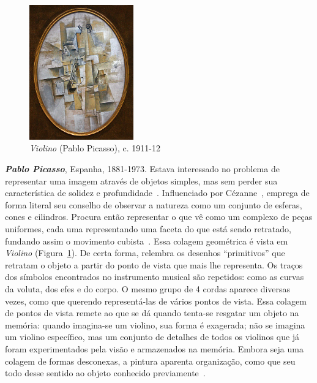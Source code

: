 \begin{figure}
  \begin{center}
    \includegraphics[width=0.4\textwidth]{figs/picasso_violino.png}
  \end{center}
  \caption{\emph{Violino} (Pablo Picasso), c. 1911-12}
  \label{fig:picasso:violino}
\end{figure}

\textbf{\emph{Pablo Picasso}}, Espanha, 1881-1973. Estava interessado
no problema de representar uma imagem através de objetos simples, mas
sem perder sua característica de solidez e
profundidade~\cite{daix,gombrich}. Influenciado por
Cézanne~\cite{rishel}, emprega de forma literal seu conselho de
observar a natureza como um conjunto de esferas, cones e
cilindros. Procura então representar o que vê como um complexo de
peças uniformes, cada uma representando uma faceta do que está sendo
retratado, fundando assim o movimento cubista~\cite{barr,golding}.
Essa colagem geométrica é vista em \emph{Violino}
(Figura~\ref{fig:picasso:violino}). De certa forma, relembra os
desenhos ``primitivos'' que retratam o objeto a partir do ponto de
vista que mais lhe representa. Os traços dos símbolos encontrados no
instrumento musical são repetidos: como as curvas da voluta, dos efes
e do corpo. O mesmo grupo de 4 cordas aparece diversas vezes, como que
querendo representá-las de vários pontos de vista. Essa colagem de
pontos de vista remete ao que se dá quando tenta-se resgatar um objeto
na memória: quando imagina-se um violino, sua forma é exagerada; não
se imagina um violino específico, mas um conjunto de detalhes de todos
os violinos que já foram experimentados pela visão e armazenados na
memória. Embora seja uma colagem de formas desconexas, a pintura
aparenta organização, como que seu todo desse sentido ao objeto
conhecido previamente~\cite{gombrich}.

